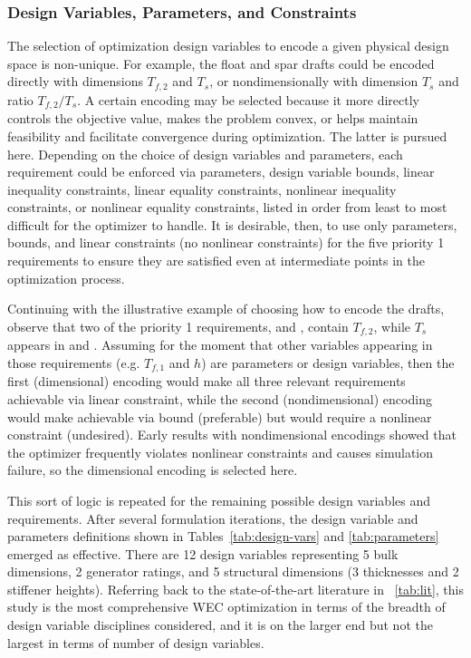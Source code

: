 \subsubsection{Design Variables, Parameters, and Constraints}
The selection of optimization design variables to encode a given physical design space is non-unique.
For example, the float and spar drafts could be encoded directly with dimensions $T_{f,2}$ and $T_s$, or nondimensionally with dimension $T_s$ and ratio $T_{f,2}/T_s$.
A certain encoding may be selected because it more directly controls the objective value, makes the problem convex, or helps maintain feasibility and facilitate convergence during optimization.
The latter is pursued here.
Depending on the choice of design variables and parameters, each requirement could be enforced via parameters, design variable bounds, linear inequality constraints, linear equality constraints, nonlinear inequality constraints, or nonlinear equality constraints, listed in order from least to most difficult for the optimizer to handle.
It is desirable, then, to use only parameters, bounds, and linear constraints (no nonlinear constraints) for the five priority 1 requirements to ensure they are satisfied even at intermediate points in the optimization process. 

Continuing with the illustrative example of choosing how to encode the drafts, observe that two of the priority 1 requirements,  and , contain $T_{f,2}$, while $T_s$ appears in  and .
Assuming for the moment that other variables appearing in those requirements (e.g. $T_{f,1}$ and $h$) are parameters or design variables, then the first (dimensional) encoding would make all three relevant requirements achievable via linear constraint, while the second (nondimensional) encoding would make  achievable via bound (preferable) but  would require a nonlinear constraint (undesired).
Early results with nondimensional encodings \cite{mccabe_multidisciplinary_2022} showed that the optimizer frequently violates nonlinear constraints and causes simulation failure, so the dimensional encoding is selected here.

This sort of logic is repeated for the remaining possible design variables and requirements.
After several formulation iterations, the design variable and parameters definitions shown in Tables~\ref{tab:design-vars} and \ref{tab:parameters} emerged as effective.
There are 12 design variables representing 5 bulk dimensions, 2 generator ratings, and 5 structural dimensions (3 thicknesses and 2 stiffener heights).
Referring back to the state-of-the-art literature in \tablename~\ref{tab:lit}, this study is the most comprehensive WEC optimization in terms of the breadth of design variable disciplines considered, and it is on the larger end but not the largest in terms of number of design variables.

